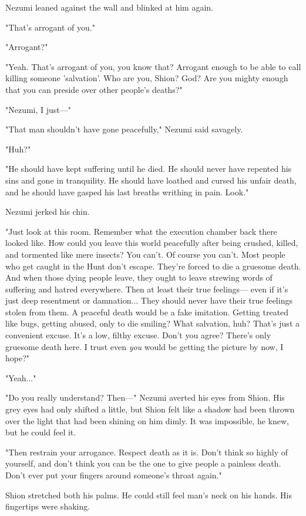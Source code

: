 Nezumi leaned against the wall and blinked at him again.

"That's arrogant of you."

"Arrogant?"

"Yeah. That's arrogant of you, you know that? Arrogant enough to be able
to call killing someone 'salvation'. Who are you, Shion? God? Are you
mighty enough that you can preside over other people's deaths?"

"Nezumi, I just---"

"That man shouldn't have gone peacefully," Nezumi said savagely.

"Huh?"

"He should have kept suffering until he died. He should never have
repented his sins and gone in tranquility. He should have loathed and
cursed his unfair death, and he should have gasped his last breaths
writhing in pain. Look."

Nezumi jerked his chin.

"Just look at this room. Remember what the execution chamber back there
looked like. How could you leave this world peacefully after being
crushed, killed, and tormented like mere insects? You can't. Of course
you can't. Most people who get caught in the Hunt don't escape. They're
forced to die a gruesome death. And when those dying people leave, they
ought to leave strewing words of suffering and hatred everywhere. Then
at least their true feelings--- even if it's just deep resentment or
damnation... They should never have their true feelings stolen from
them. A peaceful death would be a fake imitation. Getting treated like
bugs, getting abused, only to die smiling? What salvation, huh? That's
just a convenient excuse. It's a low, filthy excuse. Don't you agree?
There's only gruesome death here. I trust even \emph{you} would be getting the
picture by now, I hope?"

"Yeah..."

"Do you really understand? Then---" Nezumi averted his eyes from Shion.
His grey eyes had only shifted a little, but Shion felt like a shadow
had been thrown over the light that had been shining on him dimly. It
was impossible, he knew, but he could feel it.

"Then restrain your arrogance. Respect death as it is. Don't think so
highly of yourself, and don't think you can be the one to give people a
painless death. Don't ever put your fingers around someone's throat
again."

Shion stretched both his palms. He could still feel man's neck on his
hands. His fingertips were shaking.

